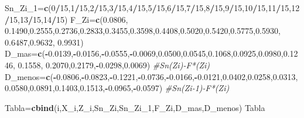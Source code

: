 \documentclass[
  a4paper,
  oneside,
  openany]{book}
\newenvironment{Shaded}{\begin{snugshade}}{\end{snugshade}}
\newcommand{\CommentTok}[1]{\textcolor[rgb]{0.56,0.35,0.01}{\textit{#1}}}
\newcommand{\DecValTok}[1]{\textcolor[rgb]{0.00,0.00,0.81}{#1}}
\newcommand{\FloatTok}[1]{\textcolor[rgb]{0.00,0.00,0.81}{#1}}
\newcommand{\KeywordTok}[1]{\textcolor[rgb]{0.13,0.29,0.53}{\textbf{#1}}}
\newcommand{\NormalTok}[1]{#1}
\newcommand{\OperatorTok}[1]{\textcolor[rgb]{0.81,0.36,0.00}{\textbf{#1}}}
\begin{document}
\begin{Shaded}
\begin{Highlighting}[]
\NormalTok{Sn\_Zi\_}\DecValTok{1}\NormalTok{=}\KeywordTok{c}\NormalTok{(}\DecValTok{0}\OperatorTok{/}\DecValTok{15}\NormalTok{,}\DecValTok{1}\OperatorTok{/}\DecValTok{15}\NormalTok{,}\DecValTok{2}\OperatorTok{/}\DecValTok{15}\NormalTok{,}\DecValTok{3}\OperatorTok{/}\DecValTok{15}\NormalTok{,}\DecValTok{4}\OperatorTok{/}\DecValTok{15}\NormalTok{,}\DecValTok{5}\OperatorTok{/}\DecValTok{15}\NormalTok{,}\DecValTok{6}\OperatorTok{/}\DecValTok{15}\NormalTok{,}\DecValTok{7}\OperatorTok{/}\DecValTok{15}\NormalTok{,}\DecValTok{8}\OperatorTok{/}\DecValTok{15}\NormalTok{,}\DecValTok{9}\OperatorTok{/}\DecValTok{15}\NormalTok{,}\DecValTok{10}\OperatorTok{/}\DecValTok{15}\NormalTok{,}\DecValTok{11}\OperatorTok{/}\DecValTok{15}\NormalTok{,}\DecValTok{12}\OperatorTok{/}\DecValTok{15}\NormalTok{,}\DecValTok{13}\OperatorTok{/}\DecValTok{15}\NormalTok{,}\DecValTok{14}\OperatorTok{/}\DecValTok{15}\NormalTok{)}
\NormalTok{F\_Zi=}\KeywordTok{c}\NormalTok{(}\FloatTok{0.0806}\NormalTok{, }\FloatTok{0.1490}\NormalTok{,}\FloatTok{0.2555}\NormalTok{,}\FloatTok{0.2736}\NormalTok{,}\FloatTok{0.2833}\NormalTok{,}\FloatTok{0.3455}\NormalTok{,}\FloatTok{0.3598}\NormalTok{,}\FloatTok{0.4408}\NormalTok{,}\FloatTok{0.5020}\NormalTok{,}\FloatTok{0.5420}\NormalTok{,}\FloatTok{0.5775}\NormalTok{,}\FloatTok{0.5930}\NormalTok{,}
       \FloatTok{0.6487}\NormalTok{,}\FloatTok{0.9632}\NormalTok{, }\FloatTok{0.9931}\NormalTok{)}
\NormalTok{D\_mas=}\KeywordTok{c}\NormalTok{(}\OperatorTok{{-}}\FloatTok{0.0139}\NormalTok{,}\OperatorTok{{-}}\FloatTok{0.0156}\NormalTok{,}\OperatorTok{{-}}\FloatTok{0.0555}\NormalTok{,}\OperatorTok{{-}}\FloatTok{0.0069}\NormalTok{,}\FloatTok{0.0500}\NormalTok{,}\FloatTok{0.0545}\NormalTok{,}\FloatTok{0.1068}\NormalTok{,}\FloatTok{0.0925}\NormalTok{,}\FloatTok{0.0980}\NormalTok{,}\FloatTok{0.1246}\NormalTok{, }\FloatTok{0.1558}\NormalTok{,}
        \FloatTok{0.2070}\NormalTok{,}\FloatTok{0.2179}\NormalTok{,}\OperatorTok{{-}}\FloatTok{0.0298}\NormalTok{,}\FloatTok{0.0069}\NormalTok{)    }\CommentTok{\#Sn(Zi){-}F*(Zi)}
\NormalTok{D\_menos=}\KeywordTok{c}\NormalTok{(}\OperatorTok{{-}}\FloatTok{0.0806}\NormalTok{,}\OperatorTok{{-}}\FloatTok{0.0823}\NormalTok{,}\OperatorTok{{-}}\FloatTok{0.1221}\NormalTok{,}\OperatorTok{{-}}\FloatTok{0.0736}\NormalTok{,}\OperatorTok{{-}}\FloatTok{0.0166}\NormalTok{,}\OperatorTok{{-}}\FloatTok{0.0121}\NormalTok{,}\FloatTok{0.0402}\NormalTok{,}\FloatTok{0.0258}\NormalTok{,}\FloatTok{0.0313}\NormalTok{, }
          \FloatTok{0.0580}\NormalTok{,}\FloatTok{0.0891}\NormalTok{,}\FloatTok{0.1403}\NormalTok{,}\FloatTok{0.1513}\NormalTok{,}\OperatorTok{{-}}\FloatTok{0.0965}\NormalTok{,}\OperatorTok{{-}}\FloatTok{0.0597}\NormalTok{)   }\CommentTok{\#Sn(Zi{-}1){-}F*(Zi)}

\NormalTok{Tabla=}\KeywordTok{cbind}\NormalTok{(i,X\_i,Z\_i,Sn\_Zi,Sn\_Zi\_}\DecValTok{1}\NormalTok{,F\_Zi,D\_mas,D\_menos)}
\NormalTok{Tabla}
\end{Highlighting}
\end{Shaded}
\end{document}
